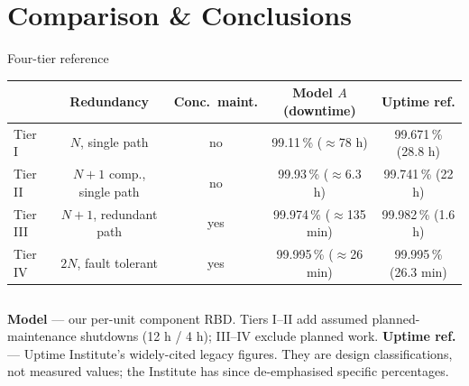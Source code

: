 \documentclass[aspectratio=169,10pt]{beamer}
\begin{document}
\section{Comparison \& Conclusions}

\begin{frame}{Four-tier reference}
  \centering
  \renewcommand{\arraystretch}{1.3}
  \footnotesize
  \begin{tabular}{lcccc}
    \toprule
    & \textbf{Redundancy} & \textbf{Conc.\ maint.} & \textbf{Model $A$ (downtime)} & \textbf{Uptime ref.} \\
    \midrule
    Tier I   & $N$, single path          & no  & 99.11\,\% ($\approx$78 h)    & 99.671\,\% (28.8 h) \\
    Tier II  & $N{+}1$ comp., single path & no  & 99.93\,\% ($\approx$6.3 h)   & 99.741\,\% (22 h)   \\
    Tier III & $N{+}1$, redundant path    & yes & 99.974\,\% ($\approx$135 min)& 99.982\,\% (1.6 h)  \\
    \rowcolor{surf2}
    Tier IV  & $2N$, fault tolerant       & yes & 99.995\,\% ($\approx$26 min) & 99.995\,\% (26.3 min) \\
    \bottomrule
  \end{tabular}

  \vspace{0.8em}
  \begin{columns}[T]
      \textbf{Model} --- our per-unit component RBD. Tiers I--II add assumed
      planned-maintenance shutdowns (12 h / 4 h); III--IV exclude planned work.
      \textbf{Uptime ref.} --- Uptime Institute's widely-cited legacy figures.
      They are design classifications, not measured values; the Institute has since
      de-emphasised specific percentages.
  \end{columns}
\end{frame}
\end{document}
